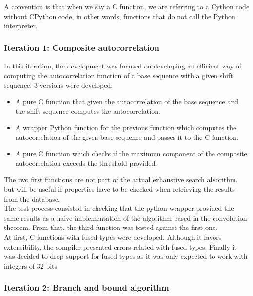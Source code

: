       A  convention is that  when we say a C function, we are referring to a Cython
      code without CPython code, in other words, functions that do not call the Python interpreter.

      \subsubsection{Iteration 1: Composite autocorrelation}

      In this iteration, the development was focused on developing an efficient
      way of computing the autocorrelation function of a base sequence with a
      given shift sequence. 3 versions were developed:
      \begin{itemize}
        \item A pure C function that given the autocorrelation of the base
        sequence and the shift sequence computes the autocorrelation.
        \item A wrapper Python function for the previous function which
        computes the autocorrelation of the given base sequence and passes it
        to the C function.
        \item A pure C function which checks if the maximum component of the
        composite autocorrelation exceeds the threshold provided.
      \end{itemize}

      The two first functions are not  part of the actual exhaustive search
      algorithm, but will be useful if properties have to be checked when retrieving the results from the database. \\

      The test process consisted in checking that the python wrapper provided
      the same results as a naive implementation of the algorithm based in
      the convolution theorem. From that, the third function was tested against the
      first one.\\

      At first, C functions with fused types were developed. Although it
      favors extensibility, the compiler presented errors related with
      fused types. Finally  it was decided to drop support for fused types
      as it was only expected to work with integers of 32 bits.\\

      \subsubsection{Iteration 2: Branch and bound algorithm}


